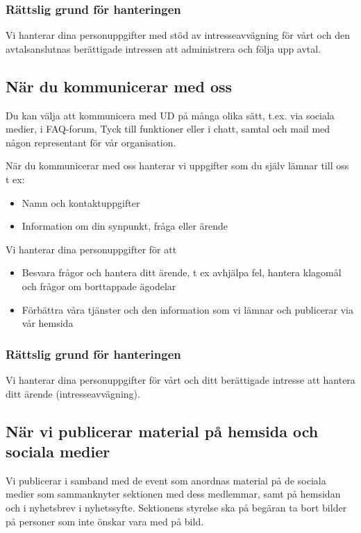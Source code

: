 \documentclass[a4paper]{article}
\begin{document}
\subsubsection{Rättslig grund för hanteringen}

Vi hanterar dina personuppgifter med stöd av intresseavvägning för vårt och den
avtalsanslutnas berättigade intressen att administrera och följa upp avtal.




\subsection{När du kommunicerar med oss}
Du kan välja att kommunicera med UD på många olika sätt, t.ex. via sociala medier, i
FAQ-forum, Tyck till funktioner eller i chatt, samtal och mail med någon representant
för vår organisation.

När du kommunicerar med oss hanterar vi uppgifter som du själv lämnar till oss t ex:
\begin{itemize}
    \item Namn och kontaktuppgifter
  \item Information om din synpunkt, fråga eller ärende
\end{itemize}

\noindent{}Vi hanterar dina personuppgifter för att
\begin{itemize}
    \item Besvara frågor och hantera ditt ärende, t ex avhjälpa fel, hantera klagomål och frågor om borttappade ägodelar
    \item Förbättra våra tjänster och den information som vi lämnar och publicerar via vår hemsida
\end{itemize}

\subsubsection{Rättslig grund för hanteringen}
Vi hanterar dina personuppgifter för vårt och ditt berättigade intresse att hantera ditt
ärende (intresseavvägning).


\subsection{När vi publicerar material på hemsida och sociala medier}

Vi publicerar i samband med de event som anordnas material på de sociala medier som
sammanknyter sektionen med dess medlemmar, samt på hemsidan och i nyhetsbrev i nyhetssyfte. Sektionens styrelse ska på begäran ta bort bilder på personer som inte önskar vara med på bild.
\end{document}
